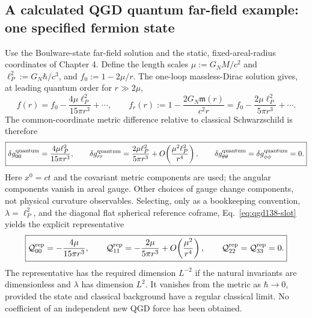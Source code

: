 \documentclass[11pt,a4paper]{article}
\theoremstyle{remark}\newtheorem{remark}[theorem]{Remark}
\begin{document}
\subsection{A calculated QGD quantum far-field example: one specified fermion state}
Use the Boulware-state far-field solution and the static, fixed-areal-radius
coordinates of Chapter 4. Define the length scales
$\mu:=G_NM/c^2$ and $\ell_P^2:=G_N\hbar/c^3$, and
$f_0:=1-2\mu/r$. The one-loop massless-Dirac solution gives, at
leading quantum order for $r\gg2\mu$,
\begin{equation}\label{eq:qgd138-correctedf}
 f(r)=f_0-\frac{4\mu\ell_P^2}{15\pi r^3}+\cdots,
 \qquad
 f_r(r):=1-\frac{2G_N\mathfrak m(r)}{c^2r}
 =f_0-\frac{2\mu\ell_P^2}{5\pi r^3}+\cdots .
\end{equation}
The common-coordinate metric difference relative to classical
Schwarzschild is therefore
\begin{equation}\label{eq:qgd138-qcomponents}
 \boxed{\delta g^{\rm quantum}_{00}=\frac{4\mu\ell_P^2}{15\pi r^3},
 \qquad \delta g^{\rm quantum}_{rr}=\frac{2\mu\ell_P^2}{5\pi r^3}
 +O\!\left(\frac{\mu^2\ell_P^2}{r^4}\right),\qquad
 \delta g^{\rm quantum}_{\theta\theta}=\delta g^{\rm quantum}_{\phi\phi}=0.}
\end{equation}
Here $x^0=ct$ and the covariant metric components are used; the
angular components vanish in areal gauge. Other choices of gauge change
components, not physical curvature observables.
Selecting, only as a bookkeeping convention, $\lambda=\ell_P^2$,
and the diagonal flat spherical reference coframe,
Eq.~\eqref{eq:qgd138-slot} yields the explicit representative
\begin{equation}\label{eq:qgd138-Qexample}
 \boxed{\mathcal Q_{00}^{\rm rep}=-\frac{4\mu}{15\pi r^3},
 \qquad \mathcal Q_{11}^{\rm rep}=-\frac{2\mu}{5\pi r^3}
 +O\!\left(\frac{\mu^2}{r^4}\right),\qquad
 \mathcal Q_{22}^{\rm rep}=\mathcal Q_{33}^{\rm rep}=0.}
\end{equation}
The representative has the required dimension $L^{-2}$ if the
natural invariants are dimensionless and $\lambda$ has dimension $L^2$.
It vanishes from the metric as $\hbar\to0$, provided the state and
classical background have a regular classical limit. No coefficient
of an independent new QGD force has been obtained.
\end{document}
